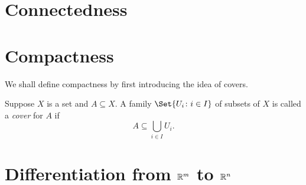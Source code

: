 \documentclass[main.tex]{subfiles}
\begin{document}
	\section{Connectedness}
	
	\section{Compactness}
		We shall define compactness by first introducing the idea of covers.
	\begin{definition}
		Suppose $X$ is a set and $A \subseteq X$. A family $\Set{U_i \colon i \in I}$ of subsets of $X$ is called a \textit{cover}  for $A$ if
		\begin{equation*}
		A \subseteq\bigcup_{i \in I} U_i.
		\end{equation*}
	\end{definition}
	\section{Differentiation from $\mathbb R^m$ to $\mathbb R^n$}
	
\end{document}
